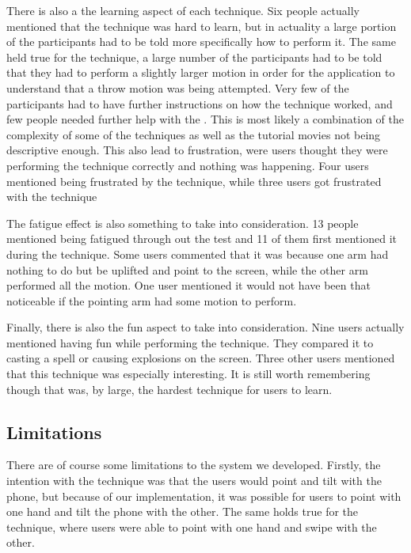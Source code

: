 There is also a the learning aspect of each technique. Six people actually mentioned that the \pinch technique was hard to learn, but in actuality a large portion of the participants had to be told more specifically how to perform it. 
The same held true for the \throw technique, a large number of the participants had to be told that they had to perform a slightly larger motion in order for the application to understand that a throw motion was being attempted.
Very few of the participants had to have further instructions on how the \swipe technique worked, and few people needed further help with the \tilt. 
This is most likely a combination of the complexity of some of the techniques as well as the tutorial movies not being descriptive enough. 
This also lead to frustration, were users thought they were performing the technique correctly and nothing was happening. 
Four users mentioned being frustrated by the \pinch technique, while three users got frustrated with the \tilt technique

The fatigue effect is also something to take into consideration. 13 people mentioned being fatigued through out the test and 11 of them first mentioned it during the \throw technique.
Some users commented that it was because one arm had nothing to do but be uplifted and point to the screen, while the other arm performed all the motion.
One user mentioned it would not have been that noticeable if the pointing arm had some motion to perform. 

Finally, there is also the fun aspect to take into consideration. Nine users actually mentioned having fun while performing the \pinch technique. 
They compared it to casting a spell or causing explosions on the screen. Three other users mentioned that this technique was especially interesting. 
It is still worth remembering though that \pinch was, by large, the hardest technique for users to learn. 

\subsection{Limitations}
There are of course some limitations to the system we developed. 
Firstly, the intention with the \tilt technique was that the users would point and tilt with the phone, but because of our implementation, it was possible for users to point with one hand and tilt the phone with the other.
The same holds true for the \swipe technique, where users were able to point with one hand and swipe with the other.

